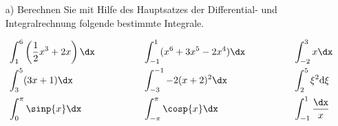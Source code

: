 \begin{itemize}
	\item[a)] Berechnen Sie mit Hilfe des Hauptsatzes der Differential- und Integralrechnung folgende bestimmte Integrale.
	
	\centering
	
	\begin{alignat*}{3}
		& \int_{1}^{6} \left(\frac{1}{2} x^3 + 2x\right) \dx \qquad \qquad && \int_{-1}^{1} (x^6 + 3x^5 - 2x^4) \dx  \qquad \qquad && \int_{-2}^{3} x \dx\\
		& \int_{3}^{5} (3x+1) \dx && \int_{-3}^{-1} -2(x+2)^2 \dx && \int_{2}^{5} \xi^2 \mathrm{d \xi}\\
		& \int_{0}^{\pi} \sinp{x} \dx && \int_{-\pi}^{\pi} \cosp{x} \dx && \int_{-1}^{1} \frac{\dx}{x}
	\end{alignat*}
\end{itemize}

